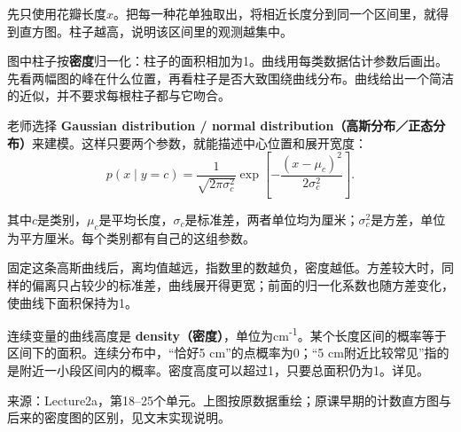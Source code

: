 




先只使用花瓣长度\(x\)。把每一种花单独取出，将相近长度分到同一个区间里，就得到直方图。柱子越高，说明该区间里的观测越集中。




图中柱子按\textbf{密度}归一化：柱子的面积相加为1。曲线用每类数据估计参数后画出。先看两幅图的峰在什么位置，再看柱子是否大致围绕曲线分布。曲线给出一个简洁的近似，并不要求每根柱子都与它吻合。


老师选择 \textbf{Gaussian distribution / normal distribution（高斯分布／正态分布）}来建模。这样只要两个参数，就能描述中心位置和展开宽度：
\[
p(x\mid y=c)=\frac{1}{\sqrt{2\pi\sigma_c^2}}
\exp\!\left[-\frac{(x-\mu_c)^2}{2\sigma_c^2}\right].
\tag{2.7}
\]


其中\(c\)是类别，\(\mu_c\)是平均长度，\(\sigma_c\)是标准差，两者单位均为厘米；\(\sigma_c^2\)是方差，单位为平方厘米。每个类别都有自己的这组参数。


固定这条高斯曲线后，离均值越远，指数里的数越负，密度越低。方差较大时，同样的偏离只占较少的标准差，曲线展开得更宽；前面的归一化系数也随方差变化，使曲线下面积保持为1。


连续变量的曲线高度是 \textbf{density（密度）}，单位为cm\textsuperscript{-}\textsuperscript{1}。某个长度区间的概率等于区间下的面积。连续分布中，“恰好5 cm”的点概率为0；“5 cm附近比较常见”指的是附近一小段区间内的概率。密度高度可以超过1，只要总面积仍为1。详见。


来源：Lecture2a，第18–25个单元。上图按原数据重绘；原课早期的计数直方图与后来的密度图的区别，见文末实现说明。








